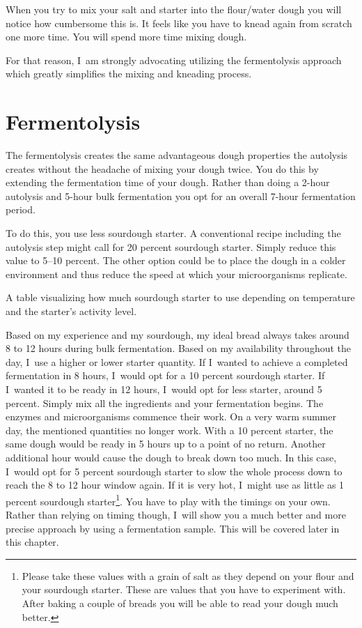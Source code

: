 When you try to mix your salt and starter into the flour/water dough you will
notice how cumbersome this is. It feels like you have to knead again from scratch
one more time. You will spend more time mixing dough.

For that reason, I~am strongly advocating utilizing the fermentolysis approach
which greatly simplifies the mixing and kneading process.

\section{Fermentolysis}%
\label{section:fermentolysis}

The fermentolysis creates the same advantageous dough properties the
autolysis creates without the headache of mixing your dough twice. You do this
by extending the fermentation time of your dough. Rather than doing a 2-hour
autolysis and 5-hour bulk fermentation you opt for an overall 7-hour
fermentation period.

To do this, you use less sourdough starter. A conventional recipe including the
autolysis step might call for 20 percent sourdough starter. Simply reduce this
value to 5--10 percent. The other option could be to place the dough in a colder
environment and thus reduce the speed at which your microorganisms replicate.

\begin{table}[!htb]
    \begin{center}
        
        \caption{A table visualizing how much sourdough starter to use
        depending on temperature and the starter's activity level.}
    \end{center}
\end{table}

Based on my experience and my sourdough, my ideal bread always takes around 8
to 12 hours during bulk fermentation. Based on my availability throughout
the day, I~use a higher or lower starter quantity. If I~wanted to achieve a completed
fermentation in 8 hours, I~would opt for a 10 percent sourdough starter. If
I~wanted it to be ready in 12 hours, I~would opt for less starter, around 5 percent.
Simply mix all the ingredients and your fermentation begins. The
enzymes and microorganisms commence their work. On a very warm summer day, the
mentioned quantities no longer work. With a 10 percent starter, the same dough
would be ready in 5 hours up to a point of no return. Another additional hour
would cause the dough to break down too much. In this case, I~would opt for 5
percent sourdough starter to slow the whole process down to reach the 8 to 12
hour window again. If it is very hot, I~might use as little as 1 percent
sourdough starter\footnote{Please take these values with a grain of salt as
they depend on your flour and your sourdough starter. These are values that
you have to experiment with. After baking a couple of breads you will be able
to read your dough much better.}. You have to play with the timings on your own.
Rather than relying on timing though, I~will show you a much better and more precise approach
by using a fermentation sample. This will be covered later in this chapter.

